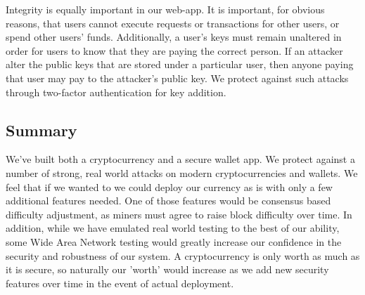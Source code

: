 \documentclass[12pt]{article}
\begin{document}
Integrity is equally important in our web-app.
It is important, for obvious reasons, that users cannot execute requests or transactions for other users, or spend other users' funds.
Additionally, a user's keys must remain unaltered in order for users to know that they are paying the correct person.
If an attacker alter the public keys that are stored under a particular user, then anyone paying that user may pay to the attacker's public key. We protect against such attacks through two-factor authentication for key addition.

\subsection{Summary}

We've built both a cryptocurrency and a secure wallet app. We protect against a number of strong, real world attacks on modern cryptocurrencies and wallets. We feel that if we wanted to we could deploy our currency as is with only a few additional features needed. One of those features would be consensus based difficulty adjustment, as miners must agree to raise block difficulty over time. In addition, while we have emulated real world testing to the best of our ability, some Wide Area Network testing would greatly increase our confidence in the security and robustness of our system. A cryptocurrency is only worth as much as it is secure, so naturally our 'worth' would increase as we add new security features over time in the event of actual deployment.
\end{document}
